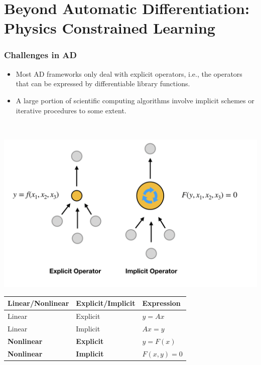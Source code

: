 \documentclass{beamer}
\begin{document}
\section{Beyond Automatic Differentiation: Physics Constrained Learning}
\begin{frame}


	\frametitle{Challenges in AD}
	
	
	\begin{minipage}[t]{0.49\textwidth}
	\vspace{-3cm}
\begin{itemize}
	\item Most AD frameworks only deal with explicit operators, i.e., the operators that can be expressed by differentiable library functions. 
	\item A large portion of scientific computing algorithms involve implicit schemes or iterative procedures to some extent.
\end{itemize}
\end{minipage}~
\begin{minipage}[t]{0.49\textwidth}
  \includegraphics[width=1.0\textwidth]{../sim.png}
\end{minipage}

\begin{table}[]
\begin{tabular}{@{}lll@{}}
\toprule
Linear/Nonlinear & Explicit/Implicit & Expression   \\ \midrule
Linear           & Explicit          & $y=Ax$       \\
Linear           & Implicit          & $Ax = y$     \\
\textbf{Nonlinear}        & \textbf{Explicit}          & $y = F(x)$   \\
\textbf{Nonlinear}        & \textbf{Implicit}          & $F(x,y) = 0$ \\ \bottomrule
\end{tabular}
\end{table}
\end{frame}
\end{document}
